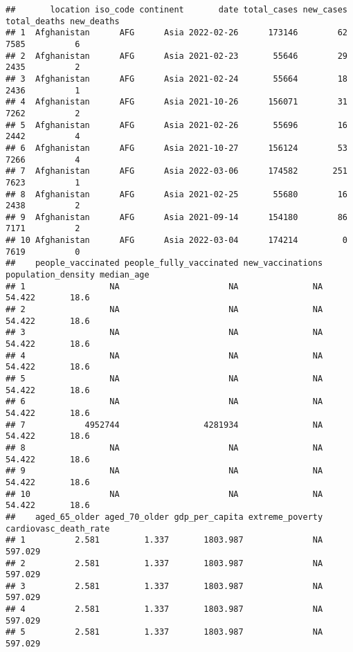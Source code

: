 \documentclass[
]{article}
\begin{document}
\begin{verbatim}
##       location iso_code continent       date total_cases new_cases total_deaths new_deaths
## 1  Afghanistan      AFG      Asia 2022-02-26      173146        62         7585          6
## 2  Afghanistan      AFG      Asia 2021-02-23       55646        29         2435          2
## 3  Afghanistan      AFG      Asia 2021-02-24       55664        18         2436          1
## 4  Afghanistan      AFG      Asia 2021-10-26      156071        31         7262          2
## 5  Afghanistan      AFG      Asia 2021-02-26       55696        16         2442          4
## 6  Afghanistan      AFG      Asia 2021-10-27      156124        53         7266          4
## 7  Afghanistan      AFG      Asia 2022-03-06      174582       251         7623          1
## 8  Afghanistan      AFG      Asia 2021-02-25       55680        16         2438          2
## 9  Afghanistan      AFG      Asia 2021-09-14      154180        86         7171          2
## 10 Afghanistan      AFG      Asia 2022-03-04      174214         0         7619          0
##    people_vaccinated people_fully_vaccinated new_vaccinations population_density median_age
## 1                 NA                      NA               NA             54.422       18.6
## 2                 NA                      NA               NA             54.422       18.6
## 3                 NA                      NA               NA             54.422       18.6
## 4                 NA                      NA               NA             54.422       18.6
## 5                 NA                      NA               NA             54.422       18.6
## 6                 NA                      NA               NA             54.422       18.6
## 7            4952744                 4281934               NA             54.422       18.6
## 8                 NA                      NA               NA             54.422       18.6
## 9                 NA                      NA               NA             54.422       18.6
## 10                NA                      NA               NA             54.422       18.6
##    aged_65_older aged_70_older gdp_per_capita extreme_poverty cardiovasc_death_rate
## 1          2.581         1.337       1803.987              NA               597.029
## 2          2.581         1.337       1803.987              NA               597.029
## 3          2.581         1.337       1803.987              NA               597.029
## 4          2.581         1.337       1803.987              NA               597.029
## 5          2.581         1.337       1803.987              NA               597.029

\end{verbatim}
\end{document}
